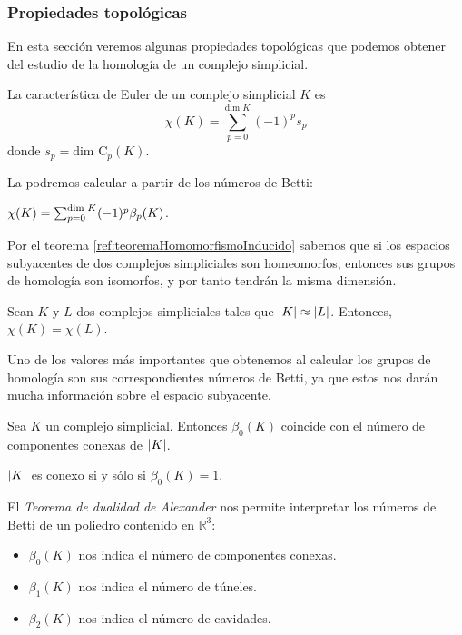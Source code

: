 \subsubsection*{Propiedades topológicas}
En esta sección veremos algunas propiedades topológicas que podemos obtener del estudio de la homología de un complejo simplicial.

\begin{definition}
La característica de Euler de un complejo simplicial $K$ es 
\[
\chi(K) = \sum_{p=0}^{\text{dim } K} (-1)^p s_p
\]
donde $s_p = \text{dim } \text{C}_p(K)$.
\end{definition}
La podremos calcular a partir de los números de Betti:
\begin{theorem}
$\chi(K) = \sum_{p=0}^{\text{\rm dim } K} (-1)^p \beta_p(K)$.
\end{theorem}

Por el teorema \ref{ref:teoremaHomomorfismoInducido} sabemos que si los espacios subyacentes de dos complejos simpliciales son homeomorfos, entonces sus grupos de homología son isomorfos, y por tanto tendrán la misma dimensión.
\begin{corollary}
\begin{sloppypar}
Sean $K$ y $L$ dos complejos simpliciales tales que $\lvert K\rvert \approx \lvert L\rvert$. Entonces, ${\chi(K)=\chi(L)}$.
\end{sloppypar}
\end{corollary}

Uno de los valores más importantes que obtenemos al calcular los grupos de homología son sus correspondientes números de Betti, ya que estos nos darán mucha información sobre el espacio subyacente. 
\begin{theorem}
Sea $K$ un complejo simplicial. Entonces $\beta_0(K)$ coincide con el número de componentes conexas de $\lvert K\rvert$.
\end{theorem}

\begin{corollary}
$\lvert K\rvert$ es conexo si y sólo si $\beta_0(K)=1$.
\end{corollary}

El \emph{Teorema de dualidad de Alexander} \cite{libroEH} nos permite interpretar los números de Betti de un poliedro contenido en $\mathbb{R}^3$: 
\begin{itemize}
	\item $\beta_0(K)$ nos indica el número de componentes conexas.
	\item $\beta_1(K)$ nos indica el número de túneles.
	\item $\beta_2(K)$ nos indica el número de cavidades.
\end{itemize}

